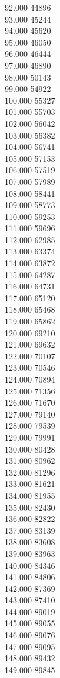 { 92.000	44896 \\
 93.000	45244 \\
 94.000	45620 \\
 95.000	46050 \\
 96.000	46444 \\
 97.000	46890 \\
 98.000	50143 \\
 99.000	54922 \\
 100.000	55327 \\
 101.000	55703 \\
 102.000	56042 \\
 103.000	56382 \\
 104.000	56741 \\
 105.000	57153 \\
 106.000	57519 \\
 107.000	57989 \\
 108.000	58441 \\
 109.000	58773 \\
 110.000	59253 \\
 111.000	59696 \\
 112.000	62985 \\
 113.000	63374 \\
 114.000	63872 \\
 115.000	64287 \\
 116.000	64731 \\
 117.000	65120 \\
 118.000	65468 \\
 119.000	65862 \\
 120.000	69210 \\
 121.000	69632 \\
 122.000	70107 \\
 123.000	70546 \\
 124.000	70894 \\
 125.000	71356 \\
 126.000	71670 \\
 127.000	79140 \\
 128.000	79539 \\
 129.000	79991 \\
 130.000	80428 \\
 131.000	80962 \\
 132.000	81296 \\
 133.000	81621 \\
 134.000	81955 \\
 135.000	82430 \\
 136.000	82822 \\
 137.000	83139 \\
 138.000	83608 \\
 139.000	83963 \\
 140.000	84346 \\
 141.000	84806 \\
 142.000	87369 \\
 143.000	87410 \\
 144.000	89019 \\
 145.000	89055 \\
 146.000	89076 \\
 147.000	89095 \\
 148.000	89432 \\
 149.000	89845 \\
}
